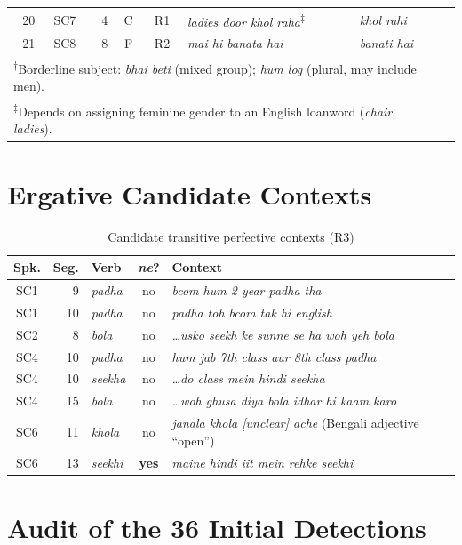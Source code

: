 \documentclass[11pt,a4paper]{report}
\begin{document}
\begin{table}[H]
\begin{tabular}{rcrcclll}
20 & SC7 &  4 & C & R1 & \textit{ladies door khol raha}\textsuperscript{$\ddagger$} & \textit{khol rahi} \\
21 & SC8 &  8 & F & R2 & \textit{mai hi banata hai} & \textit{banati hai} \\
\bottomrule
\multicolumn{7}{l}{\footnotesize \textsuperscript{$\dagger$}Borderline subject: \textit{bhai beti} (mixed group); \textit{hum log} (plural, may include men).} \\
\multicolumn{7}{l}{\footnotesize \textsuperscript{$\ddagger$}Depends on assigning feminine gender to an English loanword (\textit{chair}, \textit{ladies}).}
\end{tabular}
\end{table}

\chapter{Ergative Candidate Contexts}
\label{app:erg}

\begin{table}[H]
\centering
\caption{Candidate transitive perfective contexts (R3)}
\label{tab:ergctx}
\small
\begin{tabularx}{\textwidth}{crlcX}
\toprule
\textbf{Spk.} & \textbf{Seg.} & \textbf{Verb} & \textbf{\textit{ne}?} & \textbf{Context} \\
\midrule
SC1 &  9 & \textit{padha} & no & \textit{bcom hum 2 year padha tha} \\
SC1 & 10 & \textit{padha} & no & \textit{padha toh bcom tak hi english} \\
SC2 &  8 & \textit{bola}  & no & \textit{\ldots usko seekh ke sunne se ha woh yeh bola} \\
SC4 & 10 & \textit{padha} & no & \textit{hum jab 7th class aur 8th class padha} \\
SC4 & 10 & \textit{seekha} & no & \textit{\ldots do class mein hindi seekha} \\
SC4 & 15 & \textit{bola}  & no & \textit{\ldots woh ghusa diya bola idhar hi kaam karo} \\
SC6 & 11 & \textit{khola} & no & \textit{janala khola [unclear] ache} (Bengali adjective ``open'') \\
SC6 & 13 & \textit{seekhi} & \textbf{yes} & \textit{maine hindi iit mein rehke seekhi} \\
\bottomrule
\end{tabularx}
\end{table}

\chapter{Audit of the 36 Initial Detections}
\label{app:audit}
\end{document}

